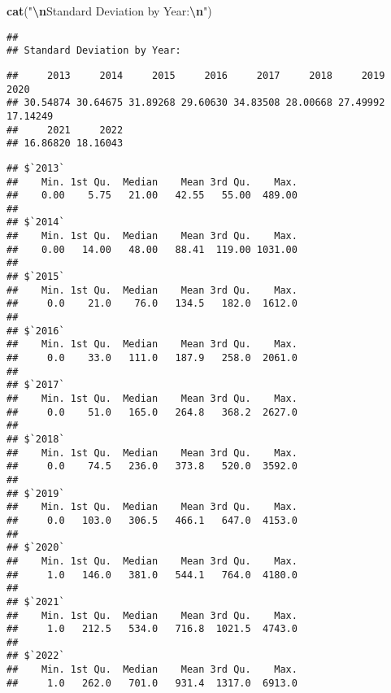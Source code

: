 \documentclass[
]{article}
\newenvironment{Shaded}{\begin{snugshade}}{\end{snugshade}}
\newcommand{\AttributeTok}[1]{\textcolor[rgb]{0.13,0.29,0.53}{#1}}
\newcommand{\ConstantTok}[1]{\textcolor[rgb]{0.56,0.35,0.01}{#1}}
\newcommand{\FunctionTok}[1]{\textcolor[rgb]{0.13,0.29,0.53}{\textbf{#1}}}
\newcommand{\NormalTok}[1]{#1}
\newcommand{\SpecialCharTok}[1]{\textcolor[rgb]{0.81,0.36,0.00}{\textbf{#1}}}
\newcommand{\StringTok}[1]{\textcolor[rgb]{0.31,0.60,0.02}{#1}}
\begin{document}
\begin{Shaded}
\begin{Highlighting}[]
\FunctionTok{cat}\NormalTok{(}\StringTok{"}\SpecialCharTok{\textbackslash{}n}\StringTok{Standard Deviation by Year:}\SpecialCharTok{\textbackslash{}n}\StringTok{"}\NormalTok{)}
\end{Highlighting}
\end{Shaded}

\begin{verbatim}
## 
## Standard Deviation by Year:
\end{verbatim}

\begin{Shaded}
\end{Shaded}

\begin{verbatim}
##     2013     2014     2015     2016     2017     2018     2019     2020 
## 30.54874 30.64675 31.89268 29.60630 34.83508 28.00668 27.49992 17.14249 
##     2021     2022 
## 16.86820 18.16043
\end{verbatim}

\begin{Shaded}
\end{Shaded}

\begin{verbatim}
## $`2013`
##    Min. 1st Qu.  Median    Mean 3rd Qu.    Max. 
##    0.00    5.75   21.00   42.55   55.00  489.00 
## 
## $`2014`
##    Min. 1st Qu.  Median    Mean 3rd Qu.    Max. 
##    0.00   14.00   48.00   88.41  119.00 1031.00 
## 
## $`2015`
##    Min. 1st Qu.  Median    Mean 3rd Qu.    Max. 
##     0.0    21.0    76.0   134.5   182.0  1612.0 
## 
## $`2016`
##    Min. 1st Qu.  Median    Mean 3rd Qu.    Max. 
##     0.0    33.0   111.0   187.9   258.0  2061.0 
## 
## $`2017`
##    Min. 1st Qu.  Median    Mean 3rd Qu.    Max. 
##     0.0    51.0   165.0   264.8   368.2  2627.0 
## 
## $`2018`
##    Min. 1st Qu.  Median    Mean 3rd Qu.    Max. 
##     0.0    74.5   236.0   373.8   520.0  3592.0 
## 
## $`2019`
##    Min. 1st Qu.  Median    Mean 3rd Qu.    Max. 
##     0.0   103.0   306.5   466.1   647.0  4153.0 
## 
## $`2020`
##    Min. 1st Qu.  Median    Mean 3rd Qu.    Max. 
##     1.0   146.0   381.0   544.1   764.0  4180.0 
## 
## $`2021`
##    Min. 1st Qu.  Median    Mean 3rd Qu.    Max. 
##     1.0   212.5   534.0   716.8  1021.5  4743.0 
## 
## $`2022`
##    Min. 1st Qu.  Median    Mean 3rd Qu.    Max. 
##     1.0   262.0   701.0   931.4  1317.0  6913.0
\end{verbatim}
\end{document}
